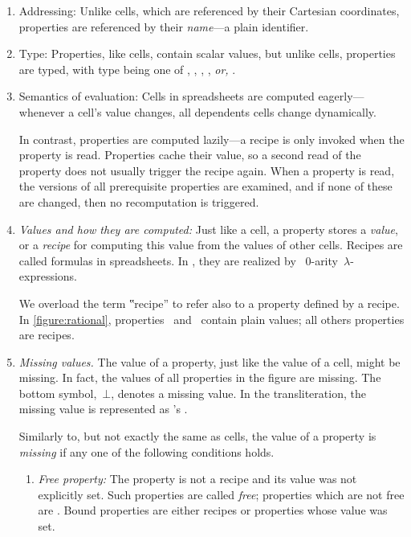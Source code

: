 \begin{enumerate}
  \item{Addressing:} Unlike cells, which are referenced by their Cartesian coordinates,
  properties are referenced by their \emph{name}---a plain identifier.

  \item{Type:} Properties, like cells, contain scalar values, but unlike cells,
  properties are typed, with type being one of , ,
  , , \emph{or,} .

  \item{Semantics of evaluation:} Cells in spreadsheets are computed
  eagerly---whenever a cell's value changes, all dependents cells change
  dynamically.

  In contrast, properties are computed lazily---a recipe is only invoked
  when the property is read. Properties cache their value, so a second read
  of the property does not usually trigger the recipe again. 
  When a property is read, the versions of all prerequisite
  properties are examined, and if none of these are changed, then no
  recomputation is triggered.

  \item\emph{Values and how they are computed:} Just like a cell, a property
  stores a \emph{value}, or a \emph{recipe} for computing this value from the
  values of other cells.
  Recipes are called formulas in spreadsheets. In \Reap, they are realized
  by \Java~$0$-arity~$λ$-expressions.%

  We overload the term ‟recipe” to refer also to a property defined by a recipe.
  In \cref{figure:rational}, properties~ and~ contain plain values; all others properties
  are recipes.

  \item\emph{Missing values.} The value of a property, just like the value
  of a cell, might be missing. In fact, the values of all properties in
  the figure are missing. The bottom symbol,~$⊥$, denotes a missing value.
  In the transliteration, the missing value is represented as \Java's
  .

  Similarly to, but not exactly the same as cells, the value of a property
  is \emph{missing} if any one of the following conditions holds.

  \begin{enumerate}
    \item \emph{Free property:} The property is not a recipe and its
          value was not explicitly set. Such properties are called \emph{free};
          properties which are not free are .
          Bound properties are either recipes or properties whose value was
          set.


\end{enumerate}
\end{enumerate}
